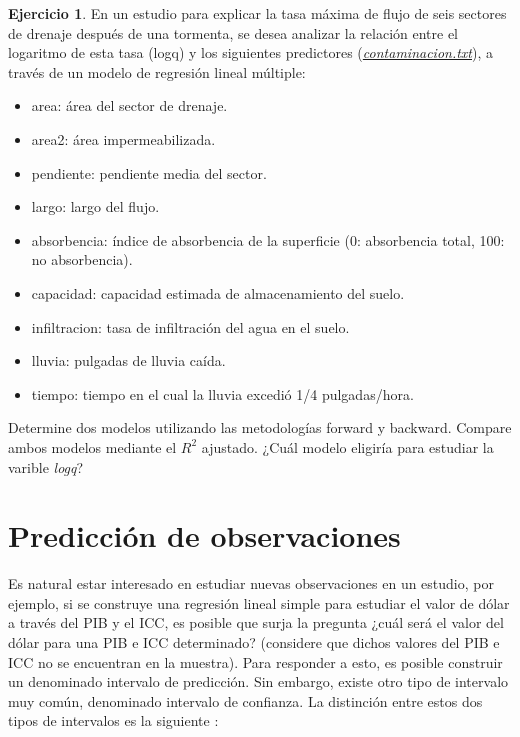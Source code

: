 \documentclass[
  11pt,
]{book}
\providecommand{\tightlist}{%
  \setlength{\itemsep}{0pt}\setlength{\parskip}{0pt}}
\theoremstyle{definition}
\theoremstyle{definition}
\theoremstyle{definition}
\newtheorem{exercise}{Ejercicio}[chapter]
\theoremstyle{definition}
\theoremstyle{remark}
\begin{document}
\begin{exercise}
\protect\hypertarget{exr:contaminacion}{}\label{exr:contaminacion}En un estudio para explicar la tasa máxima de flujo de seis sectores de drenaje después de una tormenta, se desea analizar la relación entre el logaritmo de esta tasa (logq) y los siguientes predictores (\href{https://raw.githubusercontent.com/Dfranzani/Bases-de-datos-para-cursos/main/2023-1/drenaje.txt}{\emph{contaminacion.txt}}), a través de un modelo de regresión lineal múltiple:

\begin{itemize}
\tightlist
\item
  area: área del sector de drenaje.
\item
  area2: área impermeabilizada.
\item
  pendiente: pendiente media del sector.
\item
  largo: largo del flujo.
\item
  absorbencia: índice de absorbencia de la superficie (0: absorbencia total, 100: no absorbencia).
\item
  capacidad: capacidad estimada de almacenamiento del suelo.
\item
  infiltracion: tasa de infiltración del agua en el suelo.
\item
  lluvia: pulgadas de lluvia caída.
\item
  tiempo: tiempo en el cual la lluvia excedió 1/4 pulgadas/hora.
\end{itemize}

Determine dos modelos utilizando las metodologías forward y backward. Compare ambos modelos mediante el \(R^2\) ajustado. ¿Cuál modelo eligiría para estudiar la varible \emph{logq}?
\end{exercise}

\section{Predicción de observaciones}\label{predicciuxf3n-de-observaciones}

Es natural estar interesado en estudiar nuevas observaciones en un estudio, por ejemplo, si se construye una regresión lineal simple para estudiar el valor de dólar a través del PIB y el ICC, es posible que surja la pregunta ¿cuál será el valor del dólar para una PIB e ICC determinado? (considere que dichos valores del PIB e ICC no se encuentran en la muestra). Para responder a esto, es posible construir un denominado intervalo de predicción. Sin embargo, existe otro tipo de intervalo muy común, denominado intervalo de confianza. La distinción entre estos dos tipos de intervalos es la siguiente \citep[página 125]{fahrmeir_regression_2013}:
\end{document}
